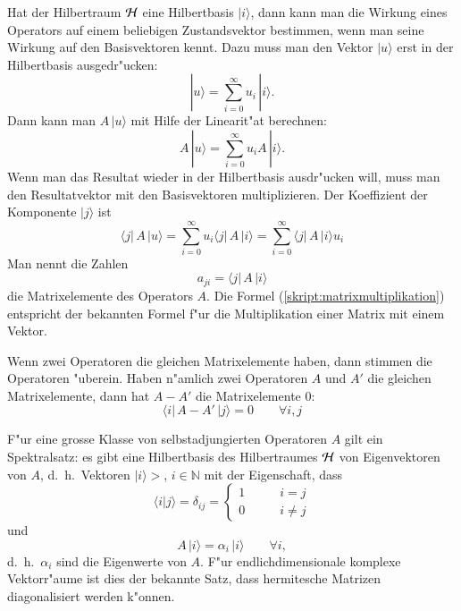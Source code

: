 Hat der Hilbertraum $\cal H$ eine Hilbertbasis $|i\rangle$, dann kann
man die Wirkung eines Operators auf einem beliebigen Zustandsvektor
bestimmen, wenn man seine Wirkung auf den Basisvektoren kennt.
Dazu muss man den Vektor $|u\rangle$ erst in der Hilbertbasis
ausgedr"ucken:
\[
|u\rangle = \sum_{i=0}^\infty u_i\, |i\rangle.
\]
Dann kann man $A\,|u\rangle$ mit Hilfe der Linearit"at berechnen:
\[
A\,|u\rangle = \sum_{i=0}^\infty u_iA\,|i\rangle.
\]
Wenn man das Resultat wieder in der Hilbertbasis ausdr"ucken will, 
muss man den Resultatvektor mit den Basisvektoren multiplizieren.
Der Koeffizient der Komponente $|j\rangle$ ist
\begin{equation}
\langle j|\,A\,|u\rangle
=
\sum_{i=0}^\infty u_i \langle j|\,A\,|i\rangle
=
\sum_{i=0}^\infty \langle j|\,A\,|i\rangle u_i
\label{skript:matrixmultiplikation}
\end{equation}
Man nennt die Zahlen
\[
a_{ji}=\langle j|\,A\,|i\rangle
\]
die Matrixelemente des Operators $A$. Die Formel (\ref{skript:matrixmultiplikation})
entspricht der bekannten Formel f"ur die Multiplikation einer Matrix
mit einem Vektor.

Wenn zwei Operatoren die gleichen Matrixelemente haben, dann stimmen
die Operatoren "uberein. Haben n"amlich zwei Operatoren $A$ und $A'$
die gleichen Matrixelemente, dann hat $A-A'$ die Matrixelemente $0$:
\[
\langle i|\,A-A'\,|j\rangle =0\qquad\forall i,j
\]

F"ur eine grosse Klasse von selbstadjungierten Operatoren $A$ gilt ein
Spektralsatz: es gibt eine Hilbertbasis des Hilbertraumes $\cal H$
von Eigenvektoren von $A$, d.~h.~Vektoren $|i\rangle>$, $i\in\mathbb N$
mit der Eigenschaft, dass 
\[
\langle i|j\rangle = \delta_{ij}=\begin{cases}
1&\qquad i=j\\
0&\qquad i\ne j
\end{cases}
\]
und 
\[
A\,|i\rangle=\alpha_i\,|i\rangle\qquad\forall i,
\]
d.~h.~$\alpha_i$ sind die Eigenwerte von $A$.
F"ur endlichdimensionale komplexe Vektorr"aume ist dies der bekannte
Satz, dass hermitesche Matrizen diagonalisiert werden k"onnen.

